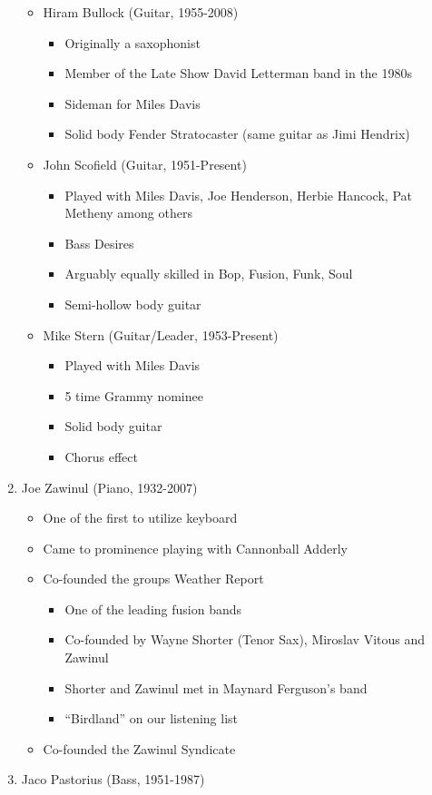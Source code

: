 \documentclass[]{article}
\providecommand{\tightlist}{%
  \setlength{\itemsep}{0pt}\setlength{\parskip}{0pt}}
\begin{document}
\begin{enumerate}
  \begin{itemize}
  \tightlist
  \item
    Hiram Bullock (Guitar, 1955-2008)

    \begin{itemize}
    \tightlist
    \item
      Originally a saxophonist
    \item
      Member of the Late Show David Letterman band in the 1980s
    \item
      Sideman for Miles Davis
    \item
      Solid body Fender Stratocaster (same guitar as Jimi Hendrix)
    \end{itemize}
  \item
    John Scofield (Guitar, 1951-Present)

    \begin{itemize}
    \tightlist
    \item
      Played with Miles Davis, Joe Henderson, Herbie Hancock, Pat
      Metheny among others
    \item
      Bass Desires
    \item
      Arguably equally skilled in Bop, Fusion, Funk, Soul
    \item
      Semi-hollow body guitar
    \end{itemize}
  \item
    Mike Stern (Guitar/Leader, 1953-Present)

    \begin{itemize}
    \tightlist
    \item
      Played with Miles Davis
    \item
      5 time Grammy nominee
    \item
      Solid body guitar
    \item
      Chorus effect
    \end{itemize}
  \end{itemize}
\item
  Joe Zawinul (Piano, 1932-2007)

  \begin{itemize}
  \tightlist
  \item
    One of the first to utilize keyboard
  \item
    Came to prominence playing with Cannonball Adderly
  \item
    Co-founded the groups Weather Report

    \begin{itemize}
    \tightlist
    \item
      One of the leading fusion bands
    \item
      Co-founded by Wayne Shorter (Tenor Sax), Miroslav Vitous and
      Zawinul
    \item
      Shorter and Zawinul met in Maynard Ferguson's band
    \item
      ``Birdland'' on our listening list
    \end{itemize}
  \item
    Co-founded the Zawinul Syndicate
  \end{itemize}
\item
  Jaco Pastorius (Bass, 1951-1987)


\end{enumerate}
\end{document}
